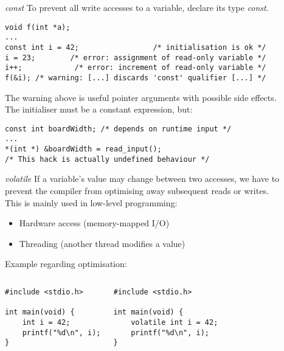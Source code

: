\begin{frame}[fragile]{\textit{const}}
To prevent all write accesses to a variable, declare its type \textit{const}.\\
\begin{lstlisting}
void f(int *a);
...
const int i = 42;				  /* initialisation is ok */
i = 23; 	   /* error: assignment of read-only variable */
i++;			/* error: increment of read-only variable */
f(&i); /* warning: [...] discards 'const' qualifier [...] */
\end{lstlisting}
The warning above is useful pointer arguments with possible side effects.\\
\bigskip
The initialiser must be a constant expression, but:
\begin{lstlisting}
const int boardWidth; /* depends on runtime input */
...
*(int *) &boardWidth = read_input();
/* This hack is actually undefined behaviour */
\end{lstlisting}
\end{frame}

\begin{frame}[fragile]{\textit{volatile}}
If a variable's value may change between two accesses, we have to\\
prevent the compiler from optimising away subsequent reads or writes.\\
\bigskip
This is mainly used in low-level programming:
\begin{itemize}
	\item Hardware access (memory-mapped I/O)
	\item Threading (another thread modifies a value)
\end{itemize}
\bigskip
Example regarding optimisation:
\begin{columns}
	\begin{lstlisting}
#include <stdio.h>

int main(void) {
    int i = 42;
    printf("%d\n", i);
}
\end{lstlisting}
	\begin{lstlisting}
#include <stdio.h>

int main(void) {
    volatile int i = 42;
    printf("%d\n", i);
}
\end{lstlisting}
\end{columns}
\end{frame}

